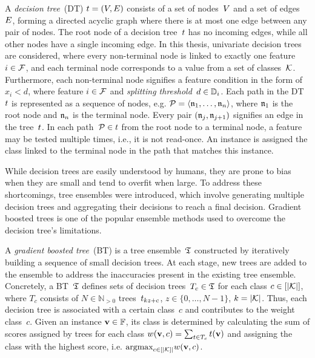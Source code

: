 A \emph{decision tree}~(DT) $t = (V, E)$ consists of a set of 
nodes~$V$ and a set of edges~$E$,
forming a directed acyclic graph where there is at most one
edge between any pair of nodes.
%
The root node of a decision tree~$t$ has no incoming edges,
while all other nodes have a single incoming edge. 
%
In this thesis, univariate decision trees are considered, 
where every non-terminal node is linked to exactly 
one feature $i \in {\mathcal{F}}$, and each terminal node 
corresponds to a value from a set of classes~${\mathcal{K}}$.
%
Furthermore, each non-terminal node signifies a feature
condition in the form of $x_i < d$, where feature $i \in {\mathcal{F}}$
and \emph{splitting threshold}~$d \in \mathbb{D}_i$.
%
Each path in the DT~$t$ is represented as a sequence of nodes, 
e.g. ${\mathcal{P}} = \langle \mathfrak{n}_1, \dots, \mathfrak{n}_n \rangle$, 
where $\mathfrak{n}_1$ is the root node and $\mathfrak{n}_n$ is the terminal node.
%
Every pair $(\mathfrak{n}_j, \mathfrak{n}_{j+1})$ signifies an edge in the tree~$t$. 
%
In each path~${\mathcal{P}} \in t$ from the root node to a terminal node, 
a feature may be tested multiple times, i.e., it is not read-once. 
%
An instance is assigned the class linked to the 
terminal node in the path that matches this instance.


While decision trees are easily understood by humans, 
they are prone to bias when they are small and tend to overfit 
when large.
%
To address these shortcomings, tree ensembles were introduced,
which involve generating multiple decision trees and aggregating
their decisions to reach a final decision.
%
Gradient boosted trees is one of the popular ensemble methods used
to overcome the decision tree's limitations.

A \emph{gradient boosted tree}~(BT) is a tree ensemble~$\mathfrak{T}$
constructed by iteratively building a sequence of small 
decision trees.
%
At each stage, new trees are added to the ensemble to address
the inaccuracies present in the existing tree ensemble.
%
Concretely, a BT~$\mathfrak{T}$ defines sets of decision trees~$T_{c} \in \mathfrak{T}$ 
for each class $c \in [|{\mathcal{K}}|]$, where $T_{c}$ consists of 
$N \in \mathbb{N}_{>0}$ trees~$t_{kz+c}$,
$z \in \{0, \dots, N-1\}$, $k = |{\mathcal{K}}|$.
%
Thus, each decision tree is associated with a certain class~$c$ 
and contributes to the weight class~$c$.
%
Given an instance $\mathbf{v}\in\mathbb{F}$, its
class is determined by calculating the sum of scores assigned
by trees for each class $w(\mathbf{v},c) = \sum_{t \in T_{c}} t(\mathbf{v})$ and
assigning the class with the highest score, i.e. $\textrm{argmax}_{c \in
[|{\mathcal{K}}]|} w(\mathbf{v},c)$.


